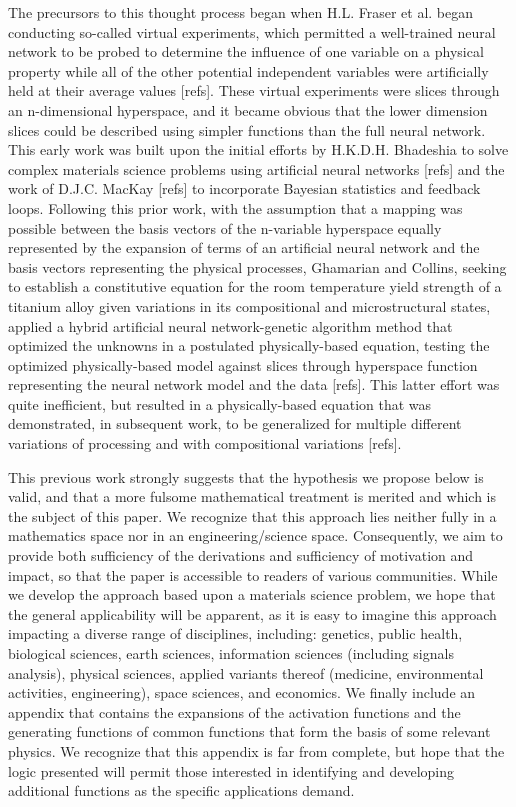 The precursors to this thought process began when H.L. Fraser et al. began conducting so-called virtual experiments, which permitted a well-trained neural network to be probed to determine the influence of one variable on a physical property while all of the other potential independent variables were artificially held at their average values [refs]. These virtual experiments were slices through an n-dimensional hyperspace, and it became obvious that the lower dimension slices could be described using simpler functions than the full neural network.  This early work was built upon the initial efforts by H.K.D.H. Bhadeshia to solve complex materials science problems using artificial neural networks [refs] and the work of D.J.C. MacKay [refs] to incorporate Bayesian statistics and feedback loops.  Following this prior work, with the assumption that a mapping was possible between the basis vectors of the n-variable hyperspace equally represented by the expansion of terms of an artificial neural network and the basis vectors representing the physical processes, Ghamarian and Collins, seeking to establish a constitutive equation for the room temperature yield strength of a titanium alloy given variations in its compositional and microstructural states, applied a hybrid artificial neural network-genetic algorithm method that optimized the unknowns in a postulated physically-based equation, testing the optimized physically-based model against slices through hyperspace function representing the neural network model and the data [refs]. This latter effort was quite inefficient, but resulted in a physically-based equation that was demonstrated, in subsequent work, to be generalized for multiple different variations of processing and with compositional variations [refs].

This previous work strongly suggests that the hypothesis we propose below is valid, and that a more fulsome mathematical treatment is merited and which is the subject of this paper.  We recognize that this approach lies neither fully in a mathematics space nor in an engineering/science space. Consequently, we aim to provide both sufficiency of the derivations and sufficiency of motivation and impact, so that the paper is accessible to readers of various communities.  While we develop the approach based upon a materials science problem, we hope that the general applicability will be apparent, as it is easy to imagine this approach impacting a diverse range of disciplines, including: genetics, public health, biological sciences, earth sciences, information sciences (including signals analysis), physical sciences, applied variants thereof (medicine, environmental activities, engineering), space sciences, and economics.  We finally include an appendix that contains the expansions of the activation functions and the generating functions of common functions that form the basis of some relevant physics.  We recognize that this appendix is far from complete, but hope that the logic presented will permit those interested in identifying and developing additional functions as the specific applications demand.

